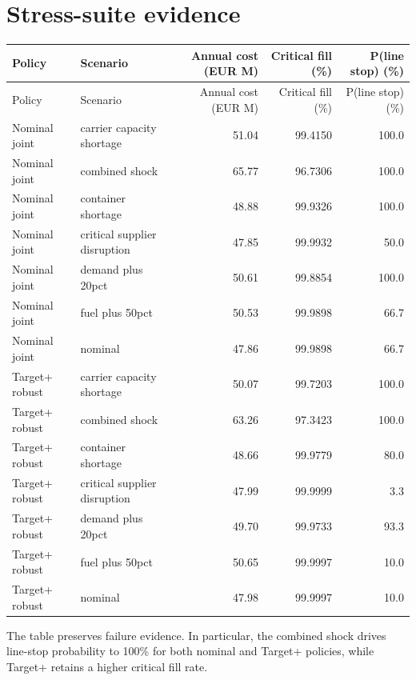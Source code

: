 \documentclass[11pt]{article}
\begin{document}
\section{Stress-suite evidence}
\begin{longtable}{llrrr}
\toprule
Policy & Scenario & Annual cost (EUR M) & Critical fill (\%) & P(line stop) (\%) \\
\midrule
\endfirsthead
\toprule
Policy & Scenario & Annual cost (EUR M) & Critical fill (\%) & P(line stop) (\%) \\
\midrule
\endhead
Nominal joint & carrier capacity shortage & 51.04 & 99.4150 & 100.0 \\
Nominal joint & combined shock & 65.77 & 96.7306 & 100.0 \\
Nominal joint & container shortage & 48.88 & 99.9326 & 100.0 \\
Nominal joint & critical supplier disruption & 47.85 & 99.9932 & 50.0 \\
Nominal joint & demand plus 20pct & 50.61 & 99.8854 & 100.0 \\
Nominal joint & fuel plus 50pct & 50.53 & 99.9898 & 66.7 \\
Nominal joint & nominal & 47.86 & 99.9898 & 66.7 \\
Target+ robust & carrier capacity shortage & 50.07 & 99.7203 & 100.0 \\
Target+ robust & combined shock & 63.26 & 97.3423 & 100.0 \\
Target+ robust & container shortage & 48.66 & 99.9779 & 80.0 \\
Target+ robust & critical supplier disruption & 47.99 & 99.9999 & 3.3 \\
Target+ robust & demand plus 20pct & 49.70 & 99.9733 & 93.3 \\
Target+ robust & fuel plus 50pct & 50.65 & 99.9997 & 10.0 \\
Target+ robust & nominal & 47.98 & 99.9997 & 10.0 \\
\bottomrule
\end{longtable}
The table preserves failure evidence. In particular, the combined shock drives line-stop probability to 100\% for both nominal and Target+ policies, while Target+ retains a higher critical fill rate.
\end{document}
